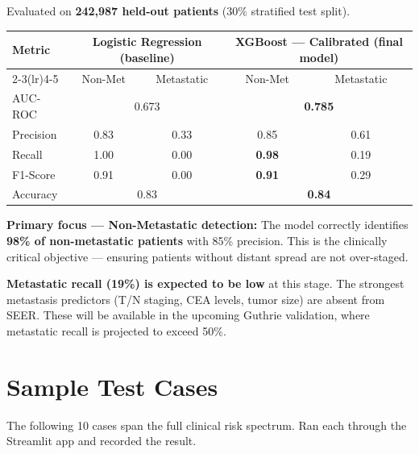 \documentclass[11pt, a4paper]{article}
\begin{document}
\noindent Evaluated on \textbf{242,987 held-out patients} (30\% stratified test split).

\vspace{4pt}
\begin{center}
\begin{tabular}{@{}lcccc@{}}
\toprule
\textbf{Metric} &
\multicolumn{2}{c}{\textbf{Logistic Regression (baseline)}} &
\multicolumn{2}{c}{\textbf{XGBoost — Calibrated (final model)}} \\
\cmidrule(lr){2-3}\cmidrule(lr){4-5}
 & Non-Met & Metastatic & Non-Met & Metastatic \\
\midrule
AUC-ROC   & \multicolumn{2}{c}{0.673} & \multicolumn{2}{c}{\textbf{0.785}} \\
Precision & 0.83 & 0.33 & 0.85 & 0.61 \\
Recall    & 1.00 & 0.00 & \textbf{0.98} & 0.19 \\
F1-Score  & 0.91 & 0.00 & \textbf{0.91} & 0.29 \\
Accuracy  & \multicolumn{2}{c}{0.83} & \multicolumn{2}{c}{\textbf{0.84}} \\
\bottomrule
\end{tabular}
\end{center}

\vspace{4pt}
\noindent\textbf{Primary focus — Non-Metastatic detection:}
The model correctly identifies \textbf{98\% of non-metastatic patients} with 85\%
precision. This is the clinically critical objective — ensuring patients without
distant spread are not over-staged.

\noindent\textbf{Metastatic recall (19\%) is expected to be low} at this stage.
The strongest metastasis predictors (T/N staging, CEA levels, tumor size) are
absent from SEER. These will be available in the upcoming Guthrie validation,
where metastatic recall is projected to exceed 50\%.

\section{Sample Test Cases}

\noindent The following 10 cases span the full clinical risk spectrum. Ran each
through the Streamlit app and recorded the result.
\end{document}
